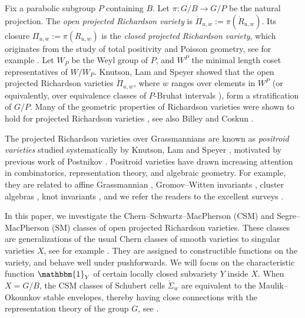 \documentclass[12pt]{amsart}
\begin{document}
Fix a parabolic subgroup $P$ containing $B$. Let $\pi\colon G/B\rightarrow G/P$ be the natural projection. The {\it open projected Richardson variety} is  $\mathring{\Pi}_{u,w}:=\pi(\mathring{R}_{u,w})$. Its closure $\Pi_{u,w}:=\pi(R_{u,w})$ is the {\it closed projected  Richardson variety}, which originates from the study of total positivity and Poisson geometry, see for example \cite{Lus98,Rie06,GY09}. 
Let $W_P$ be the Weyl group of $P$, and $W^P$ the   minimal length coset representatives of $W/W_P$. Knutson, Lam and Speyer \cite{KLS-Proj} showed that the open projected Richardson varieties $\mathring{\Pi}_{u,w}$, where $w$ ranges over elements in  $W^P$ (or equivalently, over equivalence classes of $P$-Bruhat intervals \cite[Section 2]{KLS-Proj}), form a stratification of $G/P$. 
Many of the geometric properties of Richardson varieties were shown to hold for projected Richardson varieties  \cite{KLS-Proj}, see also Billey and Coskun \cite{BC}. 

The projected Richardson varieties over Grassmannians are   known as \emph{positroid varieties} studied systematically by Knutson, Lam and Speyer \cite{KLS-Posi},  motivated by previous work of   Postnikov \cite{P06}. 
Positroid varieties have drawn  increasing attention  in combinatorics, representation theory, and algebraic geometry. For example, they are related to affine Grassmannian \cite{HL15},
Gromov--Witten invariants \cite{BKT03,BCMP18}, cluster algebras \cite{GL19}, knot invariants \cite{GL24}, and we refer the readers to the  excellent surveys \cite{Lam14, S23}. 

In this paper, we  investigate  the Chern--Schwartz--MacPherson (CSM) and Segre--MacPherson (SM) classes of  open projected Richardson varieties. 
These classes are  generalizations of the usual Chern classes of smooth varieties to singular varieties $X$, see for example \cite{MacPherson, Sch65a, Sch65b, Ohmoto}. 
They are assigned to constructible functions on the variety, and behave well under pushforwards. 
We will focus on the characteristic function $\mathbbm{1}_Y$ of certain locally closed subvariety $Y$ inside $X$. 
When $X=G/B$, the CSM classes of   Schubert cells $\mathring{\Sigma}_w$ are equivalent to the Maulik--Okounkov stable envelopes, thereby having close connections with the representation theory of the group $G$, see \cite{AMSS23, MO19}. 
\end{document}
